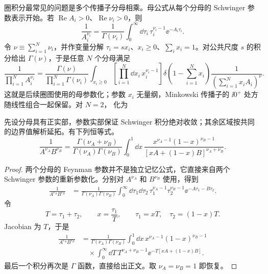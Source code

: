 圈积分最常见的问题是多个传播子分母相乘。母公式从每个分母的 Schwinger 参数表示开始。若 $\operatorname{Re}A_i>0$、$\operatorname{Re}\nu_i>0$，则
\begin{equation}
 {
 \frac1{A_i^{\nu_i}}
 =\frac1{\Gamma(\nu_i)}
 \int_0^\infty\dd\tau_i\,\tau_i^{\nu_i-1}\ee^{-A_i\tau_i}.}
 \label{eq:schwinger-parameter-r9}
\end{equation}
令 $\nu\equiv\sum_{i=1}^N\nu_i$，并作变量分解 $\tau_i=sx_i$、$x_i\ge0$、$\sum_i x_i=1$。对公共尺度 $s$ 的积分给出 $\Gamma(\nu)$，于是任意 $N$ 个分母满足
\begin{equation}
{
 \frac1{\prod_{i=1}^N A_i^{\nu_i}}
 =\frac{\Gamma(\nu)}{\prod_{i=1}^N\Gamma(\nu_i)}
 \int_{x_i\ge0}\!\left[\prod_{i=1}^N\dd x_i\,x_i^{\nu_i-1}\right]
 \delta\!\left(1-\sum_{i=1}^N x_i\right)
 \frac1{\left(\sum_{i=1}^N x_iA_i\right)^{\nu}}.}
\label{eq:feynman-n-general-dp74}
\end{equation}
这就是后续圈图使用的母参数化；参数 $x_i$ 无量纲，Minkowski 传播子的 $\ii0^+$ 处方随线性组合一起保留。对 $N=2$， 化为
\begin{proposition}
先设分母具有正实部，参数实部保证 Schwinger 积分绝对收敛；其余区域按共同的边界值解析延拓。有下列恒等式。
\begin{equation}
{
\frac1{A^{\nu_A}B^{\nu_B}}
=\frac{\Gamma(\nu_A+\nu_B)}{\Gamma(\nu_A)\Gamma(\nu_B)}
\int_0^1\dd x\,
\frac{x^{\nu_A-1}(1-x)^{\nu_B-1}}
{[xA+(1-x)B]^{\nu_A+\nu_B}}.}
\label{eq:feynman-two-general-r68}
\end{equation}
\end{proposition}
\begin{proof}
两个分母的 Feynman 参数并不是独立记忆公式，它直接来自两个 Schwinger 参数的重新参数化。分别对 $A^{\nu_A}$ 和 $B^{\nu_B}$ 使用，得到
\begin{align*}
 \frac1{A^{\nu_A}B^{\nu_B}}
 &=\frac1{\Gamma(\nu_A)\Gamma(\nu_B)}
 \int_0^\infty\dd\tau_1\dd\tau_2\,
 \tau_1^{\nu_A-1}\tau_2^{\nu_B-1}
 \ee^{-A\tau_1-B\tau_2}.
\end{align*}
令
\begin{equation*}
 T=\tau_1+\tau_2,
 \qquad x=\frac{\tau_1}{T},
 \qquad
 \tau_1=xT,
 \quad \tau_2=(1-x)T.
\end{equation*}
Jacobian 为 $T$，于是
\begin{align*}
 \frac1{A^{\nu_A}B^{\nu_B}}
 &=\frac1{\Gamma(\nu_A)\Gamma(\nu_B)}
 \int_0^1\dd x\,x^{\nu_A-1}(1-x)^{\nu_B-1}\\
 &\quad\times\int_0^\infty\dd T\,
 T^{\nu_A+\nu_B-1}
 \ee^{-T[xA+(1-x)B]}.
\end{align*}
最后一个积分再次是 $\Gamma$ 函数，直接给出正文。取 $\nu_A=\nu_B=1$ 即恢复。
\end{proof}
